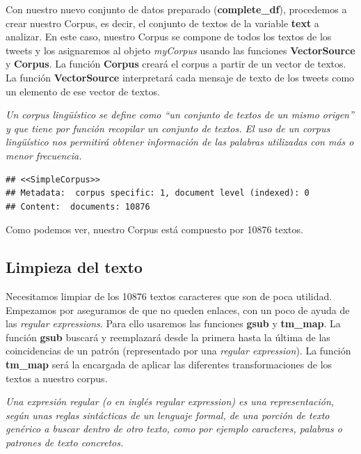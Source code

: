 \documentclass[]{article}
\newenvironment{Shaded}{\begin{snugshade}}{\end{snugshade}}
\newcommand{\KeywordTok}[1]{\textcolor[rgb]{0.13,0.29,0.53}{\textbf{#1}}}
\newcommand{\NormalTok}[1]{#1}
\newcommand{\OperatorTok}[1]{\textcolor[rgb]{0.81,0.36,0.00}{\textbf{#1}}}
\newcommand{\StringTok}[1]{\textcolor[rgb]{0.31,0.60,0.02}{#1}}
\begin{document}
Con nuestro nuevo conjunto de datos preparado (\textbf{complete\_df}),
procedemos a crear nuestro Corpus, es decir, el conjunto de textos de la
variable \textbf{text} a analizar. En este caso, nuestro Corpus se
compone de todos los textos de los tweets y los asignaremos al objeto
\emph{myCorpus} usando las funciones \textbf{VectorSource} y
\textbf{Corpus}. La función \textbf{Corpus} creará el corpus a partir de
un vector de textos. La función \textbf{VectorSource} interpretará cada
mensaje de texto de los tweets como un elemento de ese vector de textos.

\emph{Un corpus lingüístico se define como ``un conjunto de textos de un
mismo origen'' y que tiene por función recopilar un conjunto de textos.
El uso de un corpus lingüístico nos permitirá obtener información de las
palabras utilizadas con más o menor frecuencia.}

\begin{Shaded}
\end{Shaded}

\begin{verbatim}
## <<SimpleCorpus>>
## Metadata:  corpus specific: 1, document level (indexed): 0
## Content:  documents: 10876
\end{verbatim}

Como podemos ver, nuestro Corpus está compuesto por 10876 textos.

\hypertarget{limpieza-del-texto}{%
\subsection{Limpieza del texto}\label{limpieza-del-texto}}

Necesitamos limpiar de los 10876 textos caracteres que son de poca
utilidad. Empezamos por aseguramos de que no queden enlaces, con un poco
de ayuda de las \emph{regular expressions}. Para ello usaremos las
funciones \textbf{gsub} y \textbf{tm\_map}. La función \textbf{gsub}
buscará y reemplazará desde la primera hasta la última de las
coincidencias de un patrón (representado por una \emph{regular
expression}). La función \textbf{tm\_map} será la encargada de aplicar
las diferentes transformaciones de los textos a nuestro corpus.

\emph{Una expresión regular (o en inglés regular expression) es una
representación, según unas reglas sintácticas de un lenguaje formal, de
una porción de texto genérico a buscar dentro de otro texto, como por
ejemplo caracteres, palabras o patrones de texto concretos.}
\end{document}

